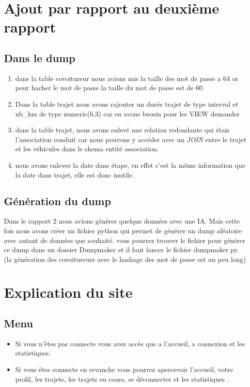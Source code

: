 \section{Ajout par rapport au deuxième rapport}
	\subsection{Dans le dump}
		\begin{enumerate}
			\item 
				dans la table covoitureur nous avions mis la taille des mot de passe a 64 or pour hacher le mot de passe la taille du mot de passe est de 60. 
			\item 
				Dans la table trajet nous avons rajouter un durée trajet de type interval et nb\_km de type numeric(6,3) car en avons beosin pour les VIEW demander 
			\item 	
				dans la table trajet, nous avons enlevé une relation redondante qui étais l'association conduit car nous pouvons y accéder avec un \textit{JOIN} entre le trajet et les véhicules dans le shema entité association.
			\item 
				nous avons enlever la date dans étape, en effet c'est la même information que la date dans trajet, elle est donc inutile.
		\end{enumerate}
	\subsection{Génération du dump}
		Dans le rapport 2 nous avions générer quelque données avec une IA. Mais cette fois nous avons créer un fichier python qui permet de générer un dump aléatoire avec autant de données que souhaité. vous pourrez trouver le fichier pour générer ce dump dans un dossier Dumpmaker et il faut lancer le fichier dumpmaker.py. (la génération des covoitureurs avec le hashage des mot de passe est un peu long)
		

\section{Explication du site}
	\subsection{Menu}
		\begin{itemize}
			\item 
				Si vous n'êtes pas connecte vous avez accès que a l'accueil, a connexion et les statistiques. 
			\item 
				Si vous êtes connecte en revanche vous pourrez apercevoir l'accueil, votre profil, les trajets, les trajets en cours, se déconnecter et les statistiques . 
		\end{itemize}
		
